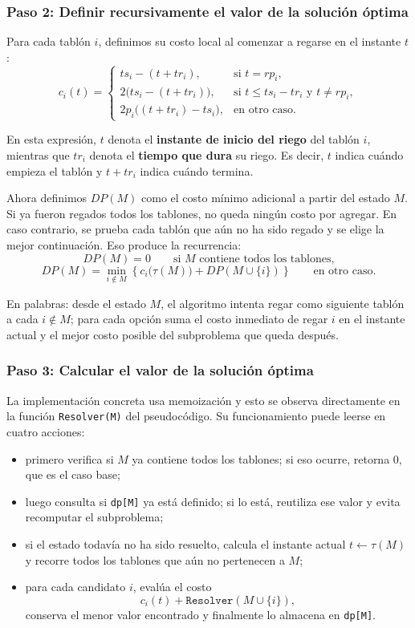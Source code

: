 \documentclass[12pt,a4paper]{article}
\newcommand{\cost}[1]{c_{#1}}
\begin{document}
\subsubsection{Paso 2: Definir recursivamente el valor de la soluci\'on \'optima}

Para cada tabl\'on \(i\), definimos su costo local al comenzar a regarse en el instante \(t\):
\[
\cost{i}(t)=
\begin{cases}
ts_i - (t + tr_i), & \text{si } t = rp_i, \\[4pt]
2\bigl(ts_i - (t + tr_i)\bigr), & \text{si } t \leq ts_i - tr_i \text{ y } t \neq rp_i, \\[4pt]
2p_i\bigl((t + tr_i) - ts_i\bigr), & \text{en otro caso.}
\end{cases}
\]

En esta expresi\'on, \(t\) denota el \textbf{instante de inicio del riego} del tabl\'on \(i\), mientras que \(tr_i\) denota el \textbf{tiempo que dura} su riego. Es decir, \(t\) indica cu\'ando empieza el tabl\'on y \(t+tr_i\) indica cu\'ando termina.

Ahora definimos \(DP(M)\) como el costo m\'inimo adicional a partir del estado \(M\). Si ya fueron regados todos los tablones, no queda ning\'un costo por agregar. En caso contrario, se prueba cada tabl\'on que a\'un no ha sido regado y se elige la mejor continuaci\'on. Eso produce la recurrencia:
\[
DP(M)=0 \qquad \text{si } M \text{ contiene todos los tablones,}
\]
\[
DP(M)=\min_{i \notin M}\left\{ \cost{i}\bigl(\tau(M)\bigr) + DP(M \cup \{i\}) \right\}
\qquad
\text{en otro caso.}
\]

En palabras: desde el estado \(M\), el algoritmo intenta regar como siguiente tabl\'on a cada \(i \notin M\); para cada opci\'on suma el costo inmediato de regar \(i\) en el instante actual y el mejor costo posible del subproblema que queda despu\'es.

\subsubsection{Paso 3: Calcular el valor de la soluci\'on \'optima}

La implementaci\'on concreta usa memoizaci\'on y esto se observa directamente en la funci\'on \texttt{Resolver(M)} del pseudoc\'odigo. Su funcionamiento puede leerse en cuatro acciones:
\begin{itemize}
  \item primero verifica si \(M\) ya contiene todos los tablones; si eso ocurre, retorna \(0\), que es el caso base;
  \item luego consulta si \texttt{dp[M]} ya est\'a definido; si lo est\'a, reutiliza ese valor y evita recomputar el subproblema;
  \item si el estado todav\'ia no ha sido resuelto, calcula el instante actual \(t \leftarrow \tau(M)\) y recorre todos los tablones que a\'un no pertenecen a \(M\);
  \item para cada candidato \(i\), eval\'ua el costo
  \[
  c_i(t) + \texttt{Resolver}(M \cup \{i\}),
  \]
  conserva el menor valor encontrado y finalmente lo almacena en \texttt{dp[M]}.
\end{itemize}
\end{document}
